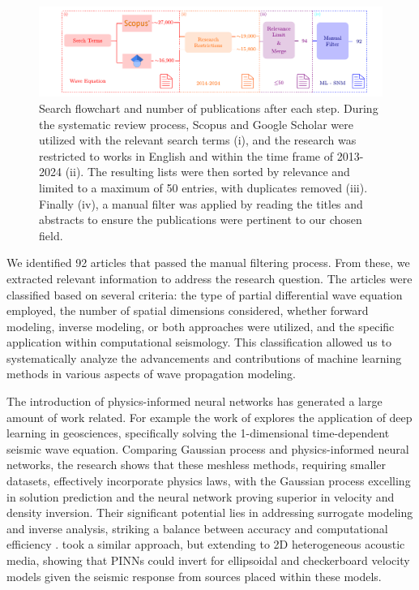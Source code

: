 \documentclass[11pt,twoside]{article}
\begin{document}
\begin{figure}[H]
    \includegraphics[width=1.0\textwidth]{figs/scheme_systematic_review.pdf}
\caption{Search flowchart and number of publications after each step. During the systematic review process, Scopus and Google Scholar were 
utilized with the relevant search terms (i), and the research was restricted to works in English and within the time frame of 2013-2024 (ii). 
The resulting lists were then sorted by relevance and limited to a maximum of 50 entries, with duplicates removed (iii). Finally (iv), a 
manual filter was applied by reading the titles and abstracts to ensure the publications were pertinent to our chosen field.}
    \label{fig:scheme_systematic_review}
\end{figure}

We identified 92 articles that passed the manual filtering process. From these, we extracted relevant information to address 
the research question. The articles were classified based on several criteria: the type of partial differential wave equation 
employed, the number of spatial dimensions considered, whether forward modeling, inverse modeling, or both approaches were 
utilized, and the specific application within computational seismology. This classification allowed us to systematically 
analyze the advancements and contributions of machine learning methods in various aspects of wave propagation modeling.


The introduction of physics-informed neural networks has generated a large amount of work related. For example the work of 
 explores the application of deep learning in geosciences, specifically solving the 1-dimensional 
time-dependent seismic wave equation. Comparing Gaussian process and physics-informed neural networks, the research shows that these meshless 
methods, requiring smaller datasets, effectively incorporate physics laws, with the Gaussian process excelling in solution prediction and the 
neural network proving superior in velocity and density inversion. Their significant potential lies in addressing surrogate modeling and 
inverse analysis, striking a balance between accuracy and computational efficiency \citep{Song2022}.  took a similar 
approach, but extending to 2D heterogeneous acoustic media, showing that PINNs could invert for ellipsoidal and checkerboard velocity models 
given the seismic response from sources placed within these models.
\end{document}
